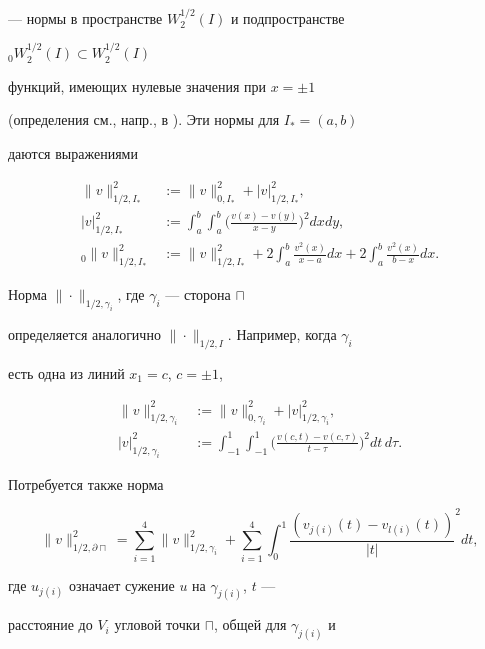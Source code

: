 --- нормы в пространстве $W^{1/2}_2(I)$ и подпространстве


${}_0W^{1/2}_2(I)\subset W^{1/2}_2(I)$


функций, имеющих нулевые значения при $x=\pm1$


(определения см., напр., в \cite{adams}). Эти нормы для $I_*=(a,b)$


даются выражениями


\begin{align*}


\|v\|^2_{1/2,I_*}&:=\|v\|^2_{0,I_*}+|v|^2_{1/2,I_*},\\


|v|_{1/2,I_*}^2&:=\int_a^b\int_a^b\bigg(


\frac {v(x)-v(y)}{x-y}\bigg)^2dxdy,\\


{}_0\|v\|_{1/2,I_*}^2&:=\|v\|_{1/2,I_*}^2+2\int_a^b


\frac{v^2(x)}{x-a}dx+2\int_a^b\frac{v^2(x)}{b-x}dx.


\end{align*}


Норма $\|\cdot\|_{1/2,\gamma_i}$, где $\gamma_i$ --- сторона $\sqcap$


определяется аналогично $\|\cdot\|_{1/2,I}$. Например, когда $\gamma_i$


есть одна из линий $x_1=c$, $c=\pm1$,


\begin{align*}


\|v\|^2_{1/2,\gamma_i}&:=\|v\|^2_{0,\gamma_i}+|v|^2_{1/2,\gamma_i},\\


|v|_{1/2,\gamma_i}^2&:=\int_{-1}^1\int_{-1}^1\bigg(


\frac{v(c,t)-v(c,\tau)}{t-\tau}\bigg)^2dt\,d\tau.


\end{align*}


Потребуется также норма


$$


\|v\|_{1/2,\partial \sqcap}^2=\sum_{i=1}^4


\|v\|_{1/2,\gamma_i}^2+\sum_{i=1}^4\int_0^1


\frac{(v_{j(i)}(t)-v_{l(i)}(t))}{|t|}^2dt,


$$


где $u_{j(i)}$ означает сужение $u$ на $\gamma_{j(i)}$, $t$ ---


расстояние до $V_i$ угловой точки $\sqcap$, общей для $\gamma_{j(i)}$ и


